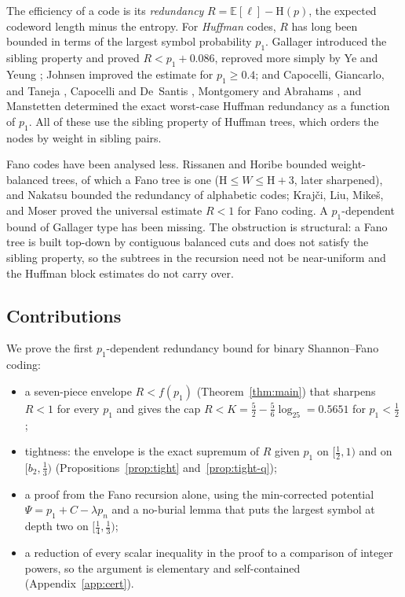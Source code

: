 \documentclass[journal]{IEEEtran}
\theoremstyle{definition}
\newcommand{\lgg}{\log_2}
\newcommand{\CC}{C}
\newcommand{\lam}{\lambda}
\begin{document}
The efficiency of a code is its \emph{redundancy}
$R=\mathbb E[\ell]-\mathrm H(p)$, the expected codeword length minus the
entropy. For \emph{Huffman} codes, $R$ has long been bounded in terms of the
largest symbol probability $p_1$. Gallager \cite{Gallager78} introduced the
sibling property and proved $R<p_1+0.086$, reproved more simply by Ye and Yeung
\cite{YeYeung02}; Johnsen \cite{Johnsen80} improved the estimate for
$p_1\ge0.4$; and Capocelli, Giancarlo, and Taneja
\cite{CapocelliGiancarloTaneja86}, Capocelli and De~Santis
\cite{CapocelliDeSantis89,CapocelliDeSantis91}, Montgomery and Abrahams
\cite{MontgomeryAbrahams87}, and Manstetten \cite{Manstetten92} determined the
exact worst-case Huffman redundancy as a function of $p_1$. All of these use the
sibling property of Huffman trees, which orders the nodes by weight in sibling
pairs.

Fano codes have been analysed less. Rissanen \cite{Rissanen73} and Horibe
\cite{Horibe77} bounded weight-balanced trees, of which a Fano tree is one
($\mathrm H\le W\le\mathrm H+3$, later sharpened), and Nakatsu \cite{Nakatsu91}
bounded the redundancy of alphabetic codes; Kraj\v{c}i, Liu, Mike\v{s}, and
Moser \cite{Krajci15} proved the universal estimate $R<1$ for Fano coding. A
$p_1$-dependent bound of Gallager type has been missing. The
obstruction is structural: a Fano tree is built top-down by contiguous balanced
cuts and does not satisfy the sibling property, so the subtrees in the recursion
need not be near-uniform and the Huffman block estimates do not carry over.

\subsection*{Contributions}
We prove the first $p_1$-dependent redundancy bound for binary Shannon--Fano
coding:
\begin{itemize}
\item a seven-piece envelope $R<f(p_1)$ (Theorem~\ref{thm:main}) that sharpens
  $R<1$ \cite{Krajci15} for every $p_1$ and gives the cap
  $R<K=\tfrac52-\tfrac56\lgg5=0.5651$ for $p_1<\tfrac12$;
\item tightness: the envelope is the exact supremum of $R$ given $p_1$ on
  $[\tfrac12,1)$ and on $[b_2,\tfrac13)$
  (Propositions~\ref{prop:tight} and~\ref{prop:tight-q});
\item a proof from the Fano recursion alone, using the min-corrected potential
  $\Psi=p_1+\CC-\lam p_n$ and a no-burial lemma that puts the largest symbol at
  depth two on $[\tfrac14,\tfrac13)$;
\item a reduction of every scalar inequality in the proof to a comparison of
  integer powers, so the argument is elementary and self-contained
  (Appendix~\ref{app:cert}).
\end{itemize}
\end{document}
